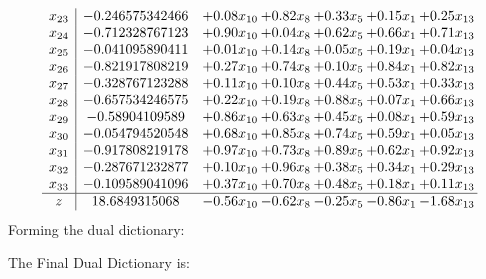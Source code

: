 \documentclass[8pt]{article}
\begin{document}
\[\begin{array}{c| c c@{\hskip 2pt} c@{\hskip 2pt} c@{\hskip 2pt} c@{\hskip 2pt} c@{\hskip 2pt} }
 x_{23}   &  -0.246575342466 & +  0.08 x_{10} & +  0.82 x_{8} & +  0.33 x_{5} & +  0.15 x_{1} & +  0.25 x_{13}\\
 x_{24}   &  -0.712328767123 & +  0.90 x_{10} & +  0.04 x_{8} & +  0.62 x_{5} & +  0.66 x_{1} & +  0.71 x_{13}\\
 x_{25}   &  -0.041095890411 & +  0.01 x_{10} & +  0.14 x_{8} & +  0.05 x_{5} & +  0.19 x_{1} & +  0.04 x_{13}\\
 x_{26}   &  -0.821917808219 & +  0.27 x_{10} & +  0.74 x_{8} & +  0.10 x_{5} & +  0.84 x_{1} & +  0.82 x_{13}\\
 x_{27}   &  -0.328767123288 & +  0.11 x_{10} & +  0.10 x_{8} & +  0.44 x_{5} & +  0.53 x_{1} & +  0.33 x_{13}\\
 x_{28}   &  -0.657534246575 & +  0.22 x_{10} & +  0.19 x_{8} & +  0.88 x_{5} & +  0.07 x_{1} & +  0.66 x_{13}\\
 x_{29}   &  -0.58904109589 & +  0.86 x_{10} & +  0.63 x_{8} & +  0.45 x_{5} & +  0.08 x_{1} & +  0.59 x_{13}\\
 x_{30}   &  -0.054794520548 & +  0.68 x_{10} & +  0.85 x_{8} & +  0.74 x_{5} & +  0.59 x_{1} & +  0.05 x_{13}\\
 x_{31}   &  -0.917808219178 & +  0.97 x_{10} & +  0.73 x_{8} & +  0.89 x_{5} & +  0.62 x_{1} & +  0.92 x_{13}\\
 x_{32}   &  -0.287671232877 & +  0.10 x_{10} & +  0.96 x_{8} & +  0.38 x_{5} & +  0.34 x_{1} & +  0.29 x_{13}\\
 x_{33}   &  -0.109589041096 & +  0.37 x_{10} & +  0.70 x_{8} & +  0.48 x_{5} & +  0.18 x_{1} & +  0.11 x_{13}\\
\hline
z    &  18.6849315068 & -0.56 x_{10} & -0.62 x_{8} & -0.25 x_{5} & -0.86 x_{1} & -1.68 x_{13}\\
\end{array}\]
Forming the dual dictionary:

The Final Dual Dictionary is: 
\end{document}

